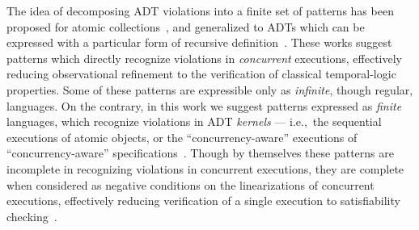 The idea of decomposing ADT violations into a finite set of patterns has been
proposed for atomic collections~\cite{conf/tacas/AbdullaHHJR13,
conf/concur/HenzingerSV13, conf/popl/DoddsHK15, conf/popl/BouajjaniEEH15}, and
generalized to ADTs which can be expressed with a particular form of recursive
definition~\cite{journals/arxiv/BouajjaniEEH15}. These works suggest patterns
which directly recognize violations in \emph{concurrent} executions,
effectively reducing observational refinement to the verification of classical
temporal-logic properties. Some of these patterns are expressible only as
\emph{infinite}, though regular, languages. On the contrary, in this work we
suggest patterns expressed as \emph{finite} languages, which recognize
violations in ADT \emph{kernels} — i.e.,~the sequential executions of atomic
objects, or the “concurrency-aware” executions of “concurrency-aware”
specifications~\cite{conf/podc/HemedR14}. Though by themselves these patterns
are incomplete in recognizing violations in concurrent executions, they are
complete when considered as negative conditions on the linearizations of
concurrent executions, effectively reducing verification of a single execution
to satisfiability checking~\cite{conf/pldi/EmmiEH15}.
